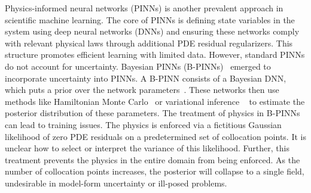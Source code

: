 
Physics-informed neural networks (PINNs) \cite{raissi2019physics} is another prevalent approach in scientific machine learning.
The core of PINNs is defining state variables in the system using deep neural networks (DNNs) and ensuring these networks comply with relevant physical laws through additional PDE residual regularizers.
This structure promotes efficient learning with limited data.
However, standard PINNs do not account for uncertainty. 
Bayesian PINNs (B-PINNs)~\cite{yang2021b} emerged to incorporate uncertainty into PINNs.
A B-PINN consists of a Bayesian DNN, which puts a prior over the network parameters~\cite{mackay1992practical, neal2012bayesian}.
These networks then use methods like Hamiltonian Monte Carlo~\cite{betancourt2017conceptual} or variational inference ~\cite{blei2017variational} to estimate the posterior distribution of these parameters. 
The treatment of physics in B-PINNs can lead to training issues.
The physics is enforced via a fictitious Gaussian likelihood of zero PDE residuals on a predetermined set of collocation points.
It is unclear how to select or interpret the variance of this likelihood.
Further, this treatment prevents the physics in the entire domain from being enforced.
As the number of collocation points increases, the posterior will collapse to a single field, undesirable in model-form uncertainty or ill-posed problems.

